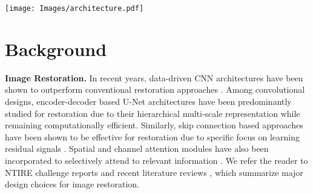 \documentclass[10pt,twocolumn,letterpaper]{article}
\def\xnet{Restormer\xspace}
\begin{document}
\begin{figure*}[t]
    \centering
    \texttt{[image: Images/architecture.pdf]}\vspace{-0.6em}
    \caption{Architecture of \xnet for high-resolution image restoration. Our \xnet consists of multiscale hierarchical design incorporating efficient Transformer blocks. The core modules of Transformer block are: \textbf{(a)} multi-Dconv head transposed attention (MDTA) that performs (spatially enriched) \emph{query}-\emph{key} feature interaction across channels rather the spatial dimension, and \textbf{(b)} Gated-Dconv feed-forward network (GDFN) that performs controlled feature transformation, \ie, to allow useful information to propagate further. }
    \label{fig:framework}
    \vspace{-1em}
\end{figure*}





\section{Background}
\label{sec:background}

\noindent \textbf{Image Restoration.} In recent years, data-driven CNN architectures \cite{rcan, zhang2020rdn, Zamir_2021_CVPR_mprnet,anwar2020densely,dudhane2021burst,zamir2020mirnet} have been shown to outperform conventional restoration approaches \cite{he2010single,timofte2013anchored,michaeli2013nonparametric,kopf2008deep}. 
Among convolutional designs, encoder-decoder based U-Net architectures \cite{deblurganv2,cho2021rethinking_mimo,Zamir_2021_CVPR_mprnet,yue2020danet,abdullah2020dpdd,wang2021uformer,zhang2021DPIR} have been predominantly studied for restoration due to their hierarchical multi-scale representation while remaining computationally efficient. 
Similarly, skip connection based approaches have been shown to be effective for restoration due to specific focus on learning residual signals \cite{zhang2019residual,liu2019dual,zamir2020mirnet,gu2019self}. 
Spatial and channel attention modules have also been incorporated to selectively attend to relevant information \cite{Zamir_2021_CVPR_mprnet,zamir2020mirnet,li2018recurrent}. 
We refer the reader to NTIRE challenge reports \cite{nah2021ntire,abuolaim2021ntire,ntire2019_denoising,ntire2019_enhancement} and recent literature reviews \cite{anwar2019deep,li2019single,tian2020deep}, which summarize major design choices for image restoration. 
\end{document}
